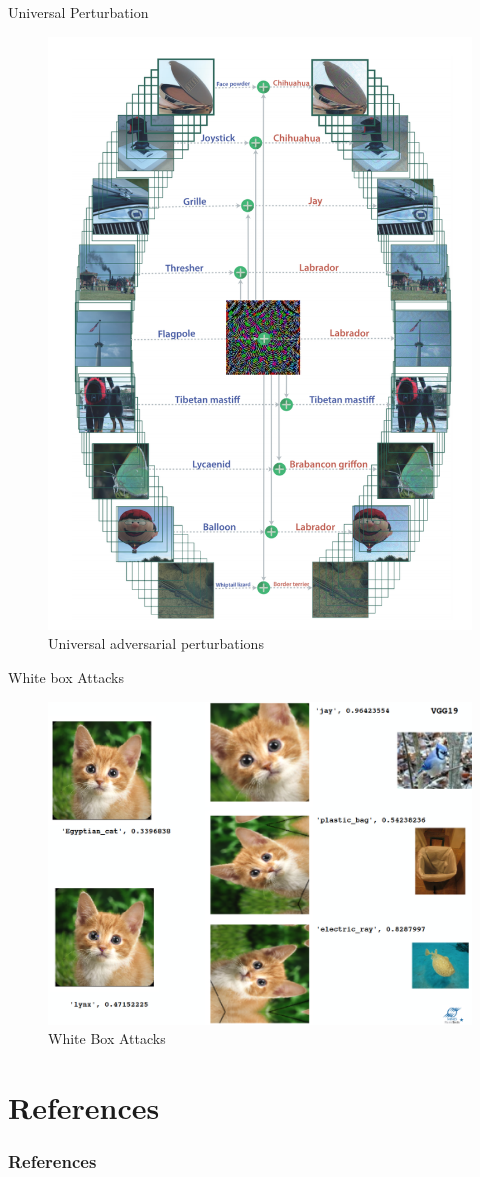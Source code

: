 \documentclass[handout,xcolor=pdftex,dvipsnames,table,mathserif]{beamer}
\begin{document}
\begin{frame}{Universal Perturbation}
\begin{figure}
\includegraphics[width=.45\columnwidth]{../graphics/UniversalPerturbation}
\caption{Universal adversarial perturbations \cite{moosavi2017universal}}
\end{figure}
\end{frame}

\begin{frame}{White box Attacks}
\begin{figure}
\includegraphics[width=.95\columnwidth]{../graphics/WhiteBoxAttack}
\caption{White Box Attacks \cite{akhtar2018threat}}
\end{figure}
\end{frame}





\section{References}
\begin{frame}[allowframebreaks]
	\frametitle{References}
	
\end{frame}
\end{document}
